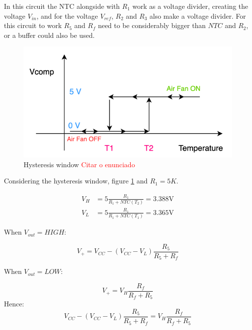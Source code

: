 In this circuit the NTC alongside with $R_1$ work as a voltage divider, creating the voltage $V_{in}$, and for the voltage $V_{ref}$, $R_2$ and $R_3$ also make a voltage divider. 
For this circuit to work $R_5$ and $R_f$ need to be considerably bigger than $NTC$ and $R_2$, or a buffer could also be used.

\begin{figure}[H]
    \centering
    \includegraphics*[scale = 0.5]{Images/HysteresisWindow.png}
    \caption{Hysteresis window \textcolor{red}{Citar o enunciado}}
    \label{fig:HysterWindow}
\end{figure}

Considering the hysteresis window, figure \ref{fig:HysterWindow} and $R_1 = 5K$.

\begin{equation}
    \begin{aligned}
        V_H &= 5\frac{R_1}{R_1 + NTC(T_2)} = 3.388 \si{\V}\\
        V_L &= 5\frac{R_1}{R_1 + NTC(T_1)} = 3.365 \si{\V}
    \end{aligned}
\end{equation}


When $V_{out} = HIGH$:

\begin{equation}
    V_+ = V_{CC}-\left (V_{CC}-V_L\right )\frac{R_5}{R_5 + R_f}
\end{equation}

When $V_{out} = LOW$:

\begin{equation}
    V_+ = V_H\frac{R_f}{R_f + R_5}
    \label{eq:VpLow}
\end{equation}
Hence:
\begin{equation}
    V_{CC}-\left (V_{CC}-V_L\right )\frac{R_5}{R_5 + R_f} = V_H\frac{R_f}{R_f + R_5}
    \label{eq:solR5}
\end{equation}

